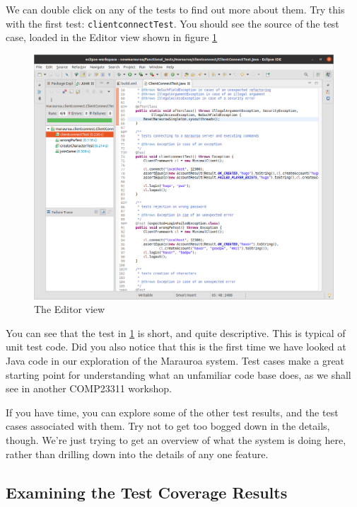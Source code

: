 \documentclass[
]{book}
\begin{document}
We can double click on any of the tests to find out more about them. Try this with the first test: \texttt{clientconnectTest}. You should see the source of the test case, loaded in the Editor view shown in figure \ref{fig:showSourceOfTestFromTestReport-fig}

\begin{figure}

{\centering \includegraphics[width=1\linewidth]{images/3.3.4showSourceOfTestFromTestReport} 

}

\caption{The Editor view}\label{fig:showSourceOfTestFromTestReport-fig}
\end{figure}

You can see that the test in \ref{fig:showSourceOfTestFromTestReport-fig} is short, and quite descriptive. This is typical of unit test code. Did you also notice that this is the first time we have looked at Java code in our exploration of the Marauroa system. Test cases make a great starting point for understanding what an unfamiliar code base does, as we shall see in another COMP23311 workshop.

If you have time, you can explore some of the other test results, and the test cases associated with them. Try not to get too bogged down in the details, though. We're just trying to get an overview of what the system is doing here, rather than drilling down into the details of any one feature.

\hypertarget{examining-the-test-coverage-results}{%
\subsection{Examining the Test Coverage Results}\label{examining-the-test-coverage-results}}
\end{document}
